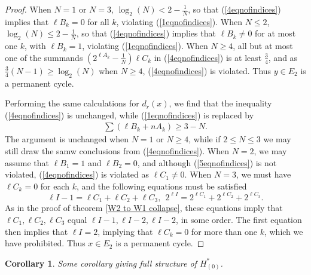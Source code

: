 \documentclass[11pt]{amsart}
\theoremstyle{plain}
\newtheorem{cor}[thm]{Corollary}
\theoremstyle{definition}
\theoremstyle{plain}
\begin{document}
\begin{Calculations of HW0}
\begin{proof}
When $N=1$ or $N=3$, $\log_2(N)<2-\frac{1}{N}$, so that (\ref{4eqnofindices}) implies that $\ell B_k=0$ for all $k$, violating (\ref{1eqnofindices}).
When $N\leq2$, $\log_2(N)\leq 2-\frac{1}{N}$, so that (\ref{4eqnofindices}) implies that $\ell B_k\neq0$ for at most one $k$, with $\ell B_k=1$, violating (\ref{1eqnofindices}).
When $N\geq4$, all but at most one of the summands $(2^{\ell A_k}-\frac{1}{N})\ell C_k$ in (\ref{4eqnofindices}) is at least $\frac{3}{4}$, and as $\frac{3}{4}(N-1)\geq\log_2(N)$ when $N\geq4$, (\ref{4eqnofindices}) is violated. Thus $y\in E_2$ is a permanent cycle.

Performing the same calculations for $d_r(x)$, we find that the inequality (\ref{4eqnofindices}) is unchanged, while (\ref{1eqnofindices}) is replaced by
\begin{gather}
\textstyle \sum(\ell B_k+nA_k)\geq3-N.\label{5eqnofindices}\end{gather}
The argument is unchanged when $N=1$ or $N\geq4$, while if $2\leq N\leq3$ we may still draw the samw conclusions from (\ref{4eqnofindices}). When $N=2$, we may assume that $\ell B_1=1$ and $\ell B_2=0$, and although (\ref{5eqnofindices}) is not violated, (\ref{4eqnofindices}) is violated as $\ell C_1\neq0$. When $N=3$, we must have $\ell C_k=0$ for each $k$, and the following equations must be satisfied
\[\ell I-1=\ell C_1+\ell C_2+\ell C_3,\ \  2^{\ell I}=2^{\ell C_1}+2^{\ell C_2}+2^{\ell C_3}.\]
As in the proof of theorem \ref{W2 to W1 collapse}, these equations imply that $\ell C_1,\ell C_2,\ell C_3$ equal $\ell I-1,\ell I-2,\ell I-2$, in some order. The first equation then implies that $\ell I=2$, implying that $\ell C_k=0$ for more than one $k$, which we have prohibited. Thus $x\in E_2$ is a permanent cycle.
\end{proof}
\begin{cor}
Some corollary giving full structure of $H^*_{(0)}$.
\end{cor}
%
%
%
%

\end{Calculations of HW0}
\end{document}
